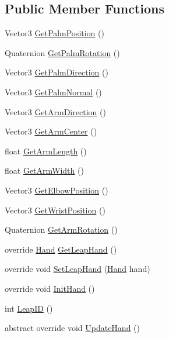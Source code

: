 \subsection*{Public Member Functions}
\begin{DoxyCompactItemize}
\item 
Vector3 \mbox{\hyperlink{class_leap_1_1_unity_1_1_hand_model_a17386cdea4e2d9bfdc9fbf88e5eafd37}{Get\+Palm\+Position}} ()
\item 
Quaternion \mbox{\hyperlink{class_leap_1_1_unity_1_1_hand_model_a5aa1271238fe3c0ef203b0150b84cf4c}{Get\+Palm\+Rotation}} ()
\item 
Vector3 \mbox{\hyperlink{class_leap_1_1_unity_1_1_hand_model_a36406d60c04839c2ebce7abdf128bda4}{Get\+Palm\+Direction}} ()
\item 
Vector3 \mbox{\hyperlink{class_leap_1_1_unity_1_1_hand_model_a9208dad95a201d7e6cb8570d325ce993}{Get\+Palm\+Normal}} ()
\item 
Vector3 \mbox{\hyperlink{class_leap_1_1_unity_1_1_hand_model_a1c754fe7a7778b4aa3bb3191f63ac13c}{Get\+Arm\+Direction}} ()
\item 
Vector3 \mbox{\hyperlink{class_leap_1_1_unity_1_1_hand_model_a2b99e4722e90a53601927c31c4ef2954}{Get\+Arm\+Center}} ()
\item 
float \mbox{\hyperlink{class_leap_1_1_unity_1_1_hand_model_af2b710f410b9eacd44d9ec1d3e36bad6}{Get\+Arm\+Length}} ()
\item 
float \mbox{\hyperlink{class_leap_1_1_unity_1_1_hand_model_ab6e83399ea1b0940cb8053d8484de6b9}{Get\+Arm\+Width}} ()
\item 
Vector3 \mbox{\hyperlink{class_leap_1_1_unity_1_1_hand_model_a453ef9c288145200df70ba1781b80329}{Get\+Elbow\+Position}} ()
\item 
Vector3 \mbox{\hyperlink{class_leap_1_1_unity_1_1_hand_model_a095aedb3f03a32b782abaf1a22861588}{Get\+Wrist\+Position}} ()
\item 
Quaternion \mbox{\hyperlink{class_leap_1_1_unity_1_1_hand_model_a2bea9f9359bb0eb9f2a66a1e2a7c889f}{Get\+Arm\+Rotation}} ()
\item 
override \mbox{\hyperlink{class_leap_1_1_hand}{Hand}} \mbox{\hyperlink{class_leap_1_1_unity_1_1_hand_model_a8b8afb06879194f1c63089f0c0202b26}{Get\+Leap\+Hand}} ()
\item 
override void \mbox{\hyperlink{class_leap_1_1_unity_1_1_hand_model_a73f417c17d35db37192c164193010ba0}{Set\+Leap\+Hand}} (\mbox{\hyperlink{class_leap_1_1_hand}{Hand}} hand)
\item 
override void \mbox{\hyperlink{class_leap_1_1_unity_1_1_hand_model_a67f1a6887e0803c96095a376fc1e6031}{Init\+Hand}} ()
\item 
int \mbox{\hyperlink{class_leap_1_1_unity_1_1_hand_model_a08cc8a5aa84e23fd16cd8f104e780b34}{Leap\+ID}} ()
\item 
abstract override void \mbox{\hyperlink{class_leap_1_1_unity_1_1_hand_model_acbb96fd18f28d01a74c1e0ac709b1977}{Update\+Hand}} ()
\end{DoxyCompactItemize}
